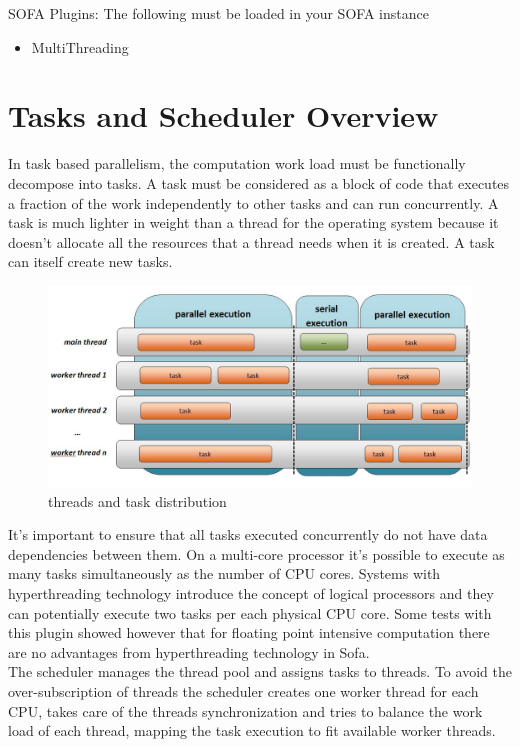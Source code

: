 \documentclass{article}
\begin{document}
SOFA Plugins:
The following must be loaded in your SOFA instance
\begin{itemize}
\item MultiThreading
\end{itemize}


\section{Tasks and Scheduler Overview}

In task based parallelism, the computation work load must be functionally decompose into tasks.
A task must be considered as a block of code that executes a fraction of the
work independently to other tasks and can run concurrently.
A task is much lighter in weight  than a thread for the operating system because it doesn't allocate all the resources that a thread needs when it is created.
A task can itself create new tasks.

\begin{figure}[!h]
	\centering
	\includegraphics[width=1.0\textwidth]{images/TaskSchedulerDesign.jpg}
	\caption{threads and task distribution}
	\label{fig:multithreading}
\end{figure}


It's important to ensure that all tasks executed concurrently do not have data dependencies between them.
On a multi-core processor it’s possible to execute as many tasks simultaneously as the number of CPU cores.
Systems with hyperthreading technology introduce the concept of logical processors and they can potentially execute two tasks per each physical CPU core.
Some tests with this plugin showed however that for floating point intensive computation there are no advantages from hyperthreading technology in Sofa.\\[\baselineskip]



The scheduler manages the thread pool and assigns tasks to threads.
To avoid the over-subscription of threads the scheduler creates one worker thread for each CPU, takes care of the threads synchronization and tries to balance the work load of each thread, mapping the task execution to fit available worker threads.\\[\baselineskip]
\end{document}
